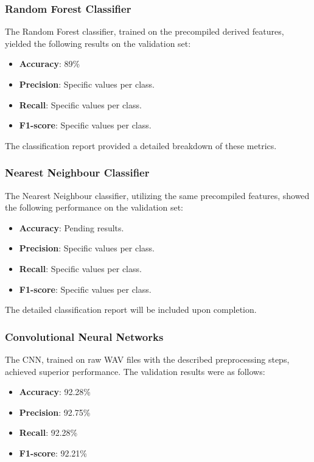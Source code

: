 \subsubsection{Random Forest Classifier}
The Random Forest classifier, trained on the precompiled derived features, yielded the following results on the validation set:
\begin{itemize}
    \item \textbf{Accuracy}: 89\%
    \item \textbf{Precision}: Specific values per class.
    \item \textbf{Recall}: Specific values per class.
    \item \textbf{F1-score}: Specific values per class.
\end{itemize}
The classification report provided a detailed breakdown of these metrics.

\subsubsection{Nearest Neighbour Classifier}
The Nearest Neighbour classifier, utilizing the same precompiled features, showed the following performance on the validation set:
\begin{itemize}
    \item \textbf{Accuracy}: Pending results.
    \item \textbf{Precision}: Specific values per class.
    \item \textbf{Recall}: Specific values per class.
    \item \textbf{F1-score}: Specific values per class.
\end{itemize}
The detailed classification report will be included upon completion.

\subsubsection{Convolutional Neural Networks}
The CNN, trained on raw WAV files with the described preprocessing steps, achieved superior performance. The validation results were as follows:
\begin{itemize}
    \item \textbf{Accuracy}: 92.28\%
    \item \textbf{Precision}: 92.75\%
    \item \textbf{Recall}: 92.28\%
    \item \textbf{F1-score}: 92.21\%
\end{itemize}

